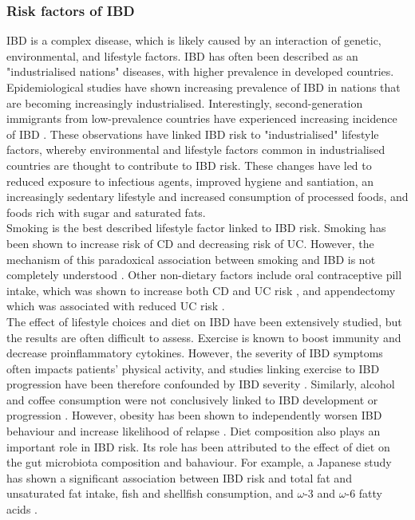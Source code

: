 \subsubsection{Risk factors of IBD}
IBD is a complex disease, which is likely caused by an interaction of genetic, environmental, and lifestyle factors. IBD has often been described as an "industrialised nations" diseases, with higher prevalence in developed countries. Epidemiological studies have shown increasing prevalence of IBD in nations that are becoming increasingly industrialised. Interestingly, second-generation immigrants from low-prevalence countries have experienced increasing incidence of IBD \cite{Bernstein2008-ln}. These observations have linked IBD risk to "industrialised" lifestyle factors, whereby environmental and lifestyle factors common in industrialised countries are thought to contribute to IBD risk. These changes have led to reduced exposure to infectious agents, improved hygiene and santiation, an increasingly sedentary lifestyle and increased consumption of processed foods, and foods rich with sugar and saturated fats.\\

Smoking is the best described lifestyle factor linked to IBD risk. Smoking has been shown to increase risk of CD and decreasing risk of UC. However, the mechanism of this paradoxical association between smoking and IBD is not completely understood \cite{Richardson2003-pd}.  Other non-dietary factors include oral contraceptive pill intake, which was shown to increase both CD and UC risk \cite{Cornish2008-rn}, and appendectomy which was associated with reduced UC risk \cite{Koutroubakis2000-qt}.\\

The effect of lifestyle choices and diet on IBD have been extensively studied, but the results are often difficult to assess. Exercise is known to boost immunity and decrease proinflammatory cytokines. However, the severity of IBD symptoms often impacts patients' physical activity, and studies linking exercise to IBD progression have been therefore confounded by IBD severity \cite{Rozich2020-ui}. Similarly, alcohol and coffee consumption were not conclusively linked to IBD development or progression \cite{Yang2019-gt}. However, obesity has been shown to independently worsen IBD behaviour and increase likelihood of relapse \cite{Jain2019-oy}. Diet composition also plays an important role in IBD risk. Its role has been attributed to the effect of diet on the gut microbiota composition and bahaviour. For example, a Japanese study has shown a significant association between IBD risk and total fat and unsaturated fat intake, fish and shellfish consumption, and $\omega$-3 and $\omega$-6 fatty acids \cite{Reif1997-li}.\\




